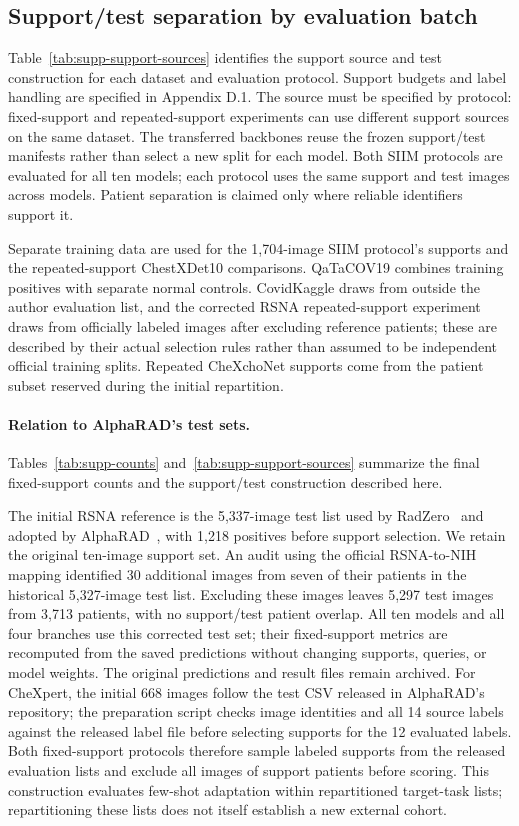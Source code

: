 \subsection{Support/test separation by evaluation batch}
\label{supp:support_sources}
Table~\ref{tab:supp-support-sources} identifies the support source and test construction for each dataset and evaluation protocol. Support budgets and label handling are specified in Appendix D.1. The source must be specified by protocol: fixed-support and repeated-support experiments can use different support sources on the same dataset. The transferred backbones reuse the frozen support/test manifests rather than select a new split for each model. Both SIIM protocols are evaluated for all ten models; each protocol uses the same support and test images across models. Patient separation is claimed only where reliable identifiers support it.

Separate training data are used for the 1,704-image SIIM protocol's supports and the repeated-support ChestXDet10 comparisons. QaTaCOV19 combines training positives with separate normal controls. CovidKaggle draws from outside the author evaluation list, and the corrected RSNA repeated-support experiment draws from officially labeled images after excluding reference patients; these are described by their actual selection rules rather than assumed to be independent official training splits. Repeated CheXchoNet supports come from the patient subset reserved during the initial repartition.



\paragraph{Relation to AlphaRAD's test sets.}
Tables~\ref{tab:supp-counts} and~\ref{tab:supp-support-sources} summarize the final fixed-support counts and the support/test construction described here.

The initial RSNA reference is the 5,337-image test list used by RadZero~\cite{radzero} and adopted by AlphaRAD~\cite{alpharad}, with 1,218 positives before support selection. We retain the original ten-image support set. An audit using the official RSNA-to-NIH mapping identified 30 additional images from seven of their patients in the historical 5,327-image test list. Excluding these images leaves 5,297 test images from 3,713 patients, with no support/test patient overlap. All ten models and all four branches use this corrected test set; their fixed-support metrics are recomputed from the saved predictions without changing supports, queries, or model weights. The original predictions and result files remain archived. For CheXpert, the initial 668 images follow the test CSV released in AlphaRAD's repository; the preparation script checks image identities and all 14 source labels against the released label file before selecting supports for the 12 evaluated labels. Both fixed-support protocols therefore sample labeled supports from the released evaluation lists and exclude all images of support patients before scoring. This construction evaluates few-shot adaptation within repartitioned target-task lists; repartitioning these lists does not itself establish a new external cohort.

